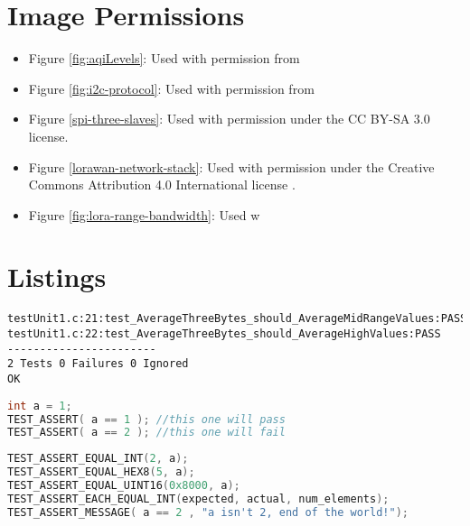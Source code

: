 \section{Image Permissions}


\begin{itemize}
\item Figure \ref{fig:aqiLevels}: Used with permission from

\item Figure \ref{fig:i2c-protocol}: Used with permission from \cite{i2c-protocol}

\item Figure \ref{spi-three-slaves}: Used with permission under the CC BY-SA 3.0 license. \cite{spi-image}

\item Figure \ref{lorawan-network-stack}: Used with permission under the Creative Commons Attribution 4.0 International license \cite{lorawan-network-stack}.

\item Figure \ref{fig:lora-range-bandwidth}: Used w
\end{itemize}

\newpage
\section{Listings}
\renewcommand{\lstlistlistingname}{}
\lstlistoflistings
\hfill

\begin{lstlisting}[label={lst:unity-report}, caption=Example Unity Test Report Output \cite{unity-homepage}]
testUnit1.c:21:test_AverageThreeBytes_should_AverageMidRangeValues:PASS
testUnit1.c:22:test_AverageThreeBytes_should_AverageHighValues:PASS
-----------------------
2 Tests 0 Failures 0 Ignored
OK
\end{lstlisting}

\begin{lstlisting}[language=C, label={lst:unity-test-assert}, caption=Unity Basic Assertion Example
\cite{unity-homepage}]
int a = 1;
TEST_ASSERT( a == 1 ); //this one will pass
TEST_ASSERT( a == 2 ); //this one will fail
\end{lstlisting}

\begin{lstlisting}[language=c, label={lst:unity-more-test-assert}, caption=More advanced Unity Assertions
\cite{unity-github}]
TEST_ASSERT_EQUAL_INT(2, a);
TEST_ASSERT_EQUAL_HEX8(5, a);
TEST_ASSERT_EQUAL_UINT16(0x8000, a);
TEST_ASSERT_EACH_EQUAL_INT(expected, actual, num_elements);
TEST_ASSERT_MESSAGE( a == 2 , "a isn't 2, end of the world!");
\end{lstlisting}


